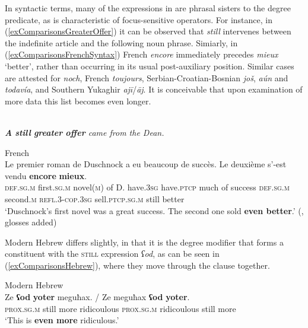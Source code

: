 {
In syntactic terms, many of the expressions in  are phrasal sisters to the degree predicate, as is characteristic of focus-sensitive operators. For instance, in (\ref{exComparisonsGreaterOffer}) it can be observed that  \textit{still} intervenes between the indefinite article and the following noun phrase. Simiarly, in (\ref{exComparisonsFrenchSyntax}) French \textit{encore} immediately precedes \textit{mieux} \lq better\rq{}, rather than occurring in its usual post-auxiliary position. Similar cases are attested for  \textit{noch}, French \textit{toujours}, Serbian-Croatian-Bosnian \textit{još},  \textit{aún} and \textit{todavía}, and Southern Yukaghir \textit{ajī}/\textit{āj}. It is conceivable that upon examination of more data this list becomes even longer.

\begin{exe}[(100)]
	\ex {}\label{exComparisonsGreaterOffer}\\
	\textit{\textbf{A} \textbf{still} \textbf{greater} \textbf{offer} came from the Dean.} \parencite[23 fn37]{Ippolito2007}
	
	\ex French\label{exComparisonsFrenchSyntax}\\
	\gll Le premier roman de Duschnock a eu beaucoup de succès. Le deuxième s’-est vendu \textbf{encore} \textbf{mieux}.\\
	\textsc{def}.\textsc{sg}.\textsc{m} first.\textsc{sg}.\textsc{m} novel(\textsc{m}) of D. have.3\textsc{sg} have.\textsc{ptcp} much of success \textsc{def}.\textsc{sg}.\textsc{m} second.\textsc{m} \textsc{refl}.3-\textsc{cop}.3\textsc{sg} sell.\textsc{ptcp}.\textsc{sg}.\textsc{m} still better\\
	\glt \lq Duschnock’s first novel was a great success. The second one sold \textbf{even better}.’ (\cite[164]{MosegaardHansen2008}, glosses added)
\end{exe}

 Modern Hebrew differs slightly, in that it is the degree modifier that forms a constituent with the \textsc{still} expression \textit{ʕod}, as can be seen in (\ref{exComparisonsHebrew}), where they move through the clause together.

\begin{exe}
	\ex Modern Hebrew\label{exComparisonsHebrew}\\
	\gll Ze \textbf{ʕod} \textbf{yoter} meguħax. \textup{/} Ze meguħax \textbf{ʕod} \textbf{yoter}.\\
	\textsc{prox}.\textsc{sg}.\textsc{m} still more ridicoulous {} \textsc{prox}.\textsc{sg}.\textsc{m} ridicoulous still more\\
	\glt \lq This is \textbf{even more} ridiculous.\rq{ }\parencite[251–252]{Glinert1976}
\end{exe}

}
